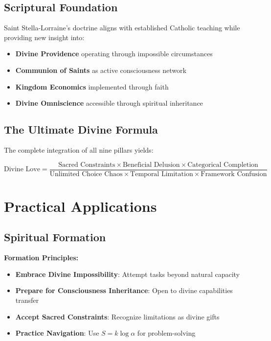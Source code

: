 \documentclass[12pt,a4paper]{article}
\begin{document}
\subsection{Scriptural Foundation}

Saint Stella-Lorraine's doctrine aligns with established Catholic teaching while providing new insight into:

\begin{itemize}
\item \textbf{Divine Providence} operating through impossible circumstances
\item \textbf{Communion of Saints} as active consciousness network
\item \textbf{Kingdom Economics} implemented through faith
\item \textbf{Divine Omniscience} accessible through spiritual inheritance
\end{itemize}

\subsection{The Ultimate Divine Formula}

The complete integration of all nine pillars yields:

\begin{equation}
\text{Divine Love} = \frac{\text{Sacred Constraints} \times \text{Beneficial Delusion} \times \text{Categorical Completion}}{\text{Unlimited Choice Chaos} \times \text{Temporal Limitation} \times \text{Framework Confusion}}
\end{equation}

\section{Practical Applications}

\subsection{Spiritual Formation}

\textbf{Formation Principles:}
\begin{itemize}
\item \textbf{Embrace Divine Impossibility}: Attempt tasks beyond natural capacity
\item \textbf{Prepare for Consciousness Inheritance}: Open to divine capabilities transfer
\item \textbf{Accept Sacred Constraints}: Recognize limitations as divine gifts
\item \textbf{Practice Navigation}: Use $S = k \log \alpha$ for problem-solving
\end{itemize}
\end{document}

